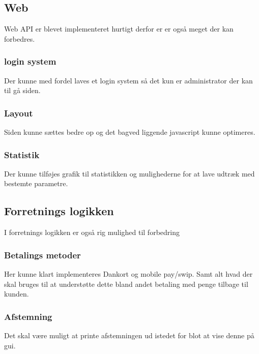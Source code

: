 \subsection{Web}
Web \gls{API} er blevet implementeret hurtigt derfor er er også meget der kan forbedres.

\subsubsection{login system}
Der kunne med fordel laves et login system så det kun er administrator der kan til gå siden.

\subsubsection{Layout}
Siden kunne sættes bedre op og det bagved liggende javascript kunne optimeres.

\subsubsection{Statistik}
Der kunne tilføjes grafik til statistikken og mulighederne for at lave udtræk med bestemte parametre.

\subsection{Forretnings logikken}
I forretnings logikken er også rig mulighed til forbedring

\subsubsection{Betalings metoder}
Her kunne klart implementeres Dankort og mobile pay/swip. 
Samt alt hvad der skal bruges til at understøtte dette bland andet betaling med penge tilbage til kunden.

\subsubsection{Afstemning}
Det skal være muligt at printe afstemningen ud istedet for blot at vise denne på gui. 

